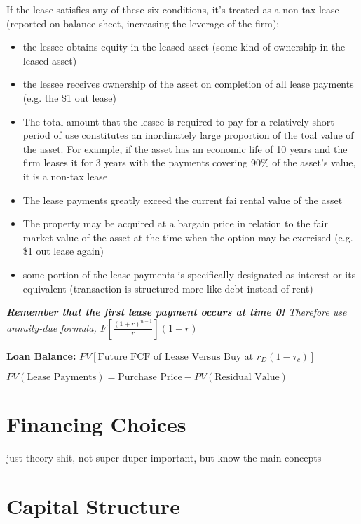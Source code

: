 \documentclass{report}
\begin{document}
\vspace*{1\baselineskip}
If the lease satisfies any of these six conditions, it's treated as a non-tax lease (reported on balance sheet, increasing the leverage of the firm):
\begin{itemize}
\item the lessee obtains equity in the leased asset (some kind of ownership in the leased asset)
\item the lessee receives ownership of the asset on completion of all lease payments (e.g. the \$1 out lease)
\item The total amount that the lessee is required to pay for a relatively short period of use constitutes an inordinately large proportion of the toal value of the asset. For example, if the asset has an economic life of 10 years and the firm leases it for 3 years with the payments covering 90\% of the asset's value, it is a non-tax lease
\item The lease payments greatly exceed the current fai rental value of the asset
\item The property may be acquired at a bargain price in relation to the fair market value of the asset at the time when the option may be exercised (e.g. \$1 out lease again)
\item some portion of the lease payments is specifically designated as interest or its equivalent (transaction is structured more like debt instead of rent)
\end{itemize}
\textit{\textbf{Remember that the first lease payment occurs at time 0!} Therefore use \emph{annuity-due formula}, $F[\frac{(1+r)^{n-1}}{r}](1+r)$}
\vspace*{1\baselineskip}

\textbf{Loan Balance:} $PV[\mbox{Future FCF of Lease Versus Buy at } r_D(1-\tau_c)]$

\vspace*{1\baselineskip}
$PV(\mbox{Lease Payments}) = \mbox{Purchase Price} - PV(\mbox{Residual Value})$

\section{Financing Choices}
\label{sec:financ-choic}

just theory shit, not super duper important, but know the main concepts

\section{Capital Structure}
\label{sec:capital-structure-1}
\end{document}
